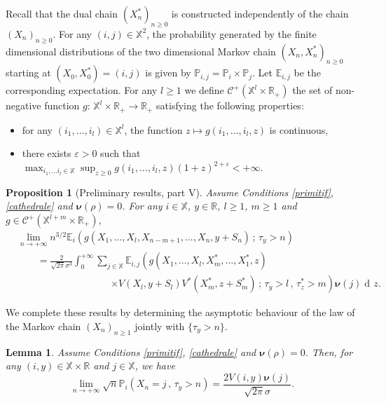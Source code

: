 \documentclass[12pt]{amsart}
\newtheorem{lemma}[theorem]{Lemma}
\newtheorem{proposition}[theorem]{Proposition}
\theoremstyle{definition}
\numberwithin{equation}{section}
\def\bb#1{\mathbb{#1}}
\def\bs#1{\boldsymbol{#1}}
\def\scr#1{\mathscr{#1}}
\def\geq{\geqslant}
\newcommand\ee{\varepsilon}
\DeclareMathOperator{\dd}{d\!}
\begin{document}
Recall that the dual chain $( X_n^* )_{n\geq 0}$ is constructed independently of the chain $( X_n )_{n\geq 0}$. For any $(i,j) \in \bb X^2$, the probability generated by the finite dimensional distributions of the two dimensional Markov chain $(X_n,X_n^*)_{n\geq 0}$ starting at $(X_0,X_0^*)=(i,j)$ is given by $\bb P_{i,j} = \bb P_i \times \bb P_j$. Let $\bb E_{i,j}$ be the corresponding expectation. For any $l \geq 1$ we define $\scr C^+ \left( \bb X^l \times \bb R_+ \right)$ the set of non-negative function $g$: $\bb X^l \times \bb R_+ \to \bb R_+$ satisfying the following properties:
\begin{itemize}
\item for any $(i_1,\dots,i_l) \in \bb X^l$, the function $z \mapsto g(i_1,\dots,i_l,z)$ is continuous,
\item there exists $\ee >0$ such that $\max_{i_1,\dots i_l \in \bb X} \sup_{z\geq 0} g(i_1,\dots,i_l,z) (1+z)^{2+\ee} < +\infty$.
\end{itemize}

\begin{proposition}[Preliminary results, part V] Assume Conditions \ref{primitif}, \ref{cathedrale} and $\bs \nu(\rho) = 0$.
\label{sorcier}
For any $i \in \bb X$, $y \in \bb R$, $l \geq 1$, $m \geq 1$ and $g \in \scr C^+ \left( \bb X^{l+m} \times \bb R_+ \right)$,
\begin{align*}
&\lim_{n\to +\infty} n^{3/2} \bb E_i \left( g \left(X_1, \dots, X_l, X_{n-m+1}, \dots, X_n, y+S_n \right) \,;\, \tau_y > n \right) \\
&\qquad = \frac{2}{\sqrt{2\pi}\sigma^3} \int_0^{+\infty} \sum_{j \in \bb X} \bb E_{i,j} \left( g \left( X_1, \dots, X_l,X_m^*,\dots,X_1^*,z \right) \right. \\
&\hspace{4cm} \left. \times V \left( X_l, y+S_l \right) V^* \left( X_m^*, z+S_m^* \right) \,;\, \tau_y > l \,,\, \tau_z^* > m \right) \bs \nu(j) \dd z.
\end{align*}
\end{proposition}

We complete these results by determining the asymptotic behaviour of the law of the Markov chain $(X_n)_{n\geq 1}$ 
jointly with $\{ \tau_y > n\}.$

\begin{lemma} \label{moustique}
Assume Conditions \ref{primitif}, \ref{cathedrale} and $\bs \nu(\rho) = 0$. 
Then, for any $(i,y) \in \bb X \times \bb R$ and $j \in \bb X$, we have
\[
\lim_{n\to +\infty} \sqrt{n} \bb P_{i} \left( X_n = j \,,\, \tau_y > n \right) = \frac{2V(i,y) \bs \nu (j)}{\sqrt{2\pi} \sigma}. 
\]
\end{lemma}
\end{document}
